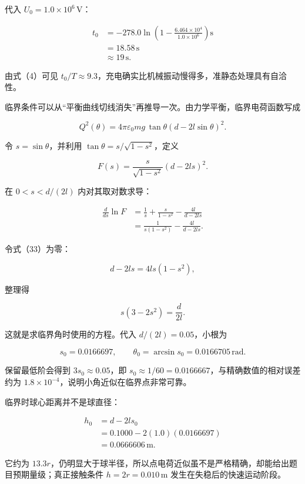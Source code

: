 \documentclass[12pt,a4paper,UTF8]{ctexart}
\begin{document}
代入 \(U_0=1.0\times10^6\,\mathrm V\)：

\[
\begin{aligned}
t_0
&=-278.0\ln\left(1-\frac{6.464\times10^4}{1.0\times10^6}\right)\mathrm s\\
&=18.58\,\mathrm s\\
&\approx\boxed{19\,\mathrm s}.
\end{aligned} \tag{30}
\]

由式（4）可见
\(t_0/T\approx9.3\)，充电确实比机械振动慢得多，准静态处理具有自洽性。

临界条件可以从``平衡曲线切线消失''再推导一次。由力学平衡，临界电荷函数写成

\[
Q^2(\theta)=4\pi\varepsilon_0mg\,\tan\theta
\left(d-2l\sin\theta\right)^2. \tag{31}
\]

令 \(s=\sin\theta\)，并利用 \(\tan\theta=s/\sqrt{1-s^2}\)，定义

\[
F(s)=\frac{s}{\sqrt{1-s^2}}(d-2ls)^2. \tag{32}
\]

在 \(0<s<d/(2l)\) 内对其取对数求导：

\[
\begin{aligned}
\frac{d}{ds}\ln F
&=\frac1s+\frac{s}{1-s^2}-\frac{4l}{d-2ls}\\
&=\frac{1}{s(1-s^2)}-\frac{4l}{d-2ls}.
\end{aligned} \tag{33}
\]

令式（33）为零：

\[
d-2ls=4ls(1-s^2), \tag{34}
\]

整理得

\[
\boxed{s(3-2s^2)=\frac{d}{2l}}. \tag{35}
\]

这就是求临界角时使用的方程。代入 \(d/(2l)=0.05\)，小根为

\[
s_0=0.0166697,
\qquad
\theta_0=\arcsin s_0=0.0166705\,\mathrm{rad}. \tag{36}
\]

保留最低阶会得到 \(3s_0\approx0.05\)，即
\(s_0\approx1/60=0.0166667\)，与精确数值的相对误差约为
\(1.8\times10^{-4}\)，说明小角近似在临界点非常可靠。

临界时球心距离并不是球直径：

\[
\begin{aligned}
h_0
&=d-2ls_0\\
&=0.1000-2(1.0)(0.0166697)\\
&=0.0666606\,\mathrm m.
\end{aligned} \tag{37}
\]

它约为
\(13.3r\)，仍明显大于球半径，所以点电荷近似虽不是严格精确，却能给出题目预期量级；真正接触条件
\(h=2r=0.010\,\mathrm m\) 发生在失稳后的快速运动阶段。
\end{document}
